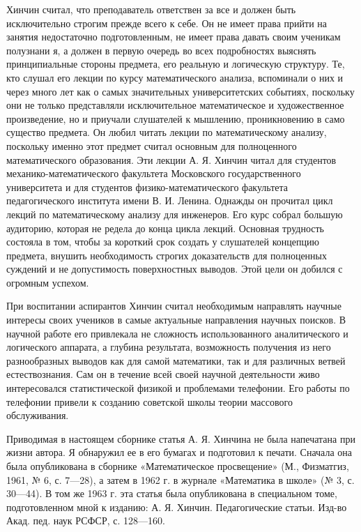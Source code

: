 \documentclass[12pt, a4paper, openany]{book}
\begin{document}
Хинчин считал, что преподаватель ответствен за все и должен быть исключительно строгим прежде всего к себе. Он не имеет права прийти на занятия недостаточно  подготовленным, не имеет права давать своим ученикам полузнани я, а должен в первую очередь во всех подробностях  выяснять принципиальные стороны предмета, его реальную и  логическую структуру. Те, кто слушал его лекции по курсу математического анализа, вспоминали о них и через много лет как о самых значительных университетских событиях, поскольку они не только представляли исключительное  математическое и художественное произведение, но и  приучали слушателей к мышлению, проникновению в само  существо предмета. Он любил читать лекции по  математическому анализу, поскольку именно этот предмет считал  основным для полноценного математического образования. Эти лекции А. Я. Хинчин читал для студентов механико-математического факультета Московского государственного университета и для студентов физико-математического  факультета педагогического института имени В. И. Ленина. Однажды он прочитал цикл лекций по математическому анализу для инженеров. Его курс собрал большую  аудиторию, которая не редела до конца цикла лекций. Основная трудность состояла в том, чтобы за короткий срок создать у слушателей концепцию предмета, внушить необходимость строгих доказательств для полноценных суждений и не допустимость поверхностных выводов. Этой цели он  добился с огромным успехом. 

При воспитании аспирантов Хинчин считал  необходимым направлять научные интересы своих учеников в самые актуальные направления научных поисков. В научной работе его привлекала не сложность использованного  аналитического и логического аппарата, а глубина результата, возможность получения из него разнообразных выводов как для самой математики, так и для различных ветвей  естествознания. Сам он в течение всей своей научной  деятельности живо интересовался статистической физикой и  проблемами телефонии. Его работы по телефонии привели к  созданию советской школы теории массового обслуживания. 

Приводимая в настоящем сборнике статья А. Я. Хинчина не была напечатана при жизни автора. Я обнаружил ее в его бумагах и подготовил к печати. Сначала она была опубликована в сборнике «Математическое просвещение» (М., Физматгиз, 1961, № 6, с. 7—28), а затем в 1962 г. в журнале «Математика в школе» (№ 3, с. 30—44). В том же 1963 г. эта статья была опубликована в специальном томе, подготовленном мной к изданию: А. Я. Хинчин.  Педагогические статьи. Изд-во Акад. пед. наук РСФСР, с. 128—160. 
 
\end{document}
